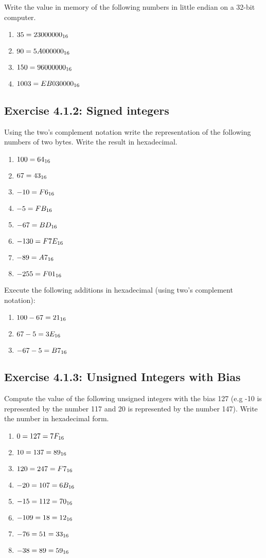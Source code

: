 \documentclass[12pt, a4paper, oneside]{article}
\begin{document}
Write the value in memory of the following numbers in little endian on a 32-bit computer.
\begin{enumerate}[$\bullet$]
  \item $35 \hfill = 23 00 00 00_{16}$
  \item $90 \hfill = 5A 00 00 00_{16}$
  \item $150 \hfill = 96 00 00 00_{16}$
  \item $1003 \hfill = EB 03 00 00_{16}$
\end{enumerate}

\subsection{Exercise 4.1.2: Signed integers}
Using the two's complement notation write the representation of the following numbers of two bytes. Write the result in hexadecimal.
\begin{enumerate}[$\bullet$]
  \item $100 \hfill = 64_{16}$
  \item $67 \hfill = 43_{16}$
  \item $-10 \hfill = F6_{16}$
  \item $-5 \hfill = FB_{16}$
  \item $-67 \hfill = BD_{16}$
  \item $-130 \hfill = F7E_{16}$
  \item $-89 \hfill = A7_{16}$
  \item $-255 \hfill = F01_{16}$
\end{enumerate}

Execute the following additions in hexadecimal (using two's complement notation):
\begin{enumerate}[$\bullet$]
  \item $100 -67 \hfill = 21_{16}$
  \item $67 -5 \hfill = 3E_{16}$
  \item $-67-5 \hfill = B7_{16}$
\end{enumerate}

\subsection{Exercise 4.1.3: Unsigned Integers with Bias}
Compute the value of the following unsigned integers with the bias 127 (e.g -10 is represented by the number 117 and 20 is represented by the number 147). Write the number in hexadecimal form.
\begin{enumerate}
  \item $0 \hfill = 127 = 7F_{16}$
  \item $10 \hfill = 137 = 89_{16}$
  \item $120 \hfill = 247 = F7_{16}$
  \item $-20 \hfill = 107 = 6B_{16}$
  \item $-15 \hfill = 112 = 70_{16}$
  \item $-109 \hfill = 18 = 12_{16}$
  \item $-76 \hfill = 51 = 33_{16}$
  \item $-38 \hfill = 89 = 59_{16}$
\end{enumerate} 
\end{document}
